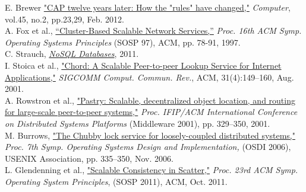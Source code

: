\documentclass[12pt]{article}
\begin{document}
\clearpage
\begin{thebibliography}{9}

	E. Brewer
	\href{http://ieeexplore.ieee.org.proxy.uchicago.edu/ielx5/2/6155638/06133253.pdf}
	{"CAP twelve years later: How the "rules" have changed,"}
	{\em Computer}, vol.45, no.2, pp.23,29,
	Feb. 2012. \\

	A. Fox et al.,
	\href{http://www.cs.berkeley.edu/~brewer/cs262b/TACC.pdf}
	{“Cluster-Based Scalable Network Services,”}
	{\em Proc. 16th ACM Symp. Operating Systems Principles} 
	(SOSP 97),
	ACM,
	pp. 78-91,
	1997. \\

	C. Strauch,
	\href{http://www.christof-strauch.de/nosqldbs.pdf}
	{\em NoSQL Databases},
	2011. \\

	I. Stoica et al.,
	\href{http://pdos.csail.mit.edu/papers/chord:sigcomm01/chord_sigcomm.pdf}
	{"Chord: A Scalable Peer-to-peer Lookup Service for Internet Applications,"} 
	{\em SIGCOMM Comput. Commun. Rev.},
	ACM, 31(4):149–160,
	Aug. 2001. \\

	A. Rowstron et al.,
	\href{http://www.cs.unibo.it/~babaoglu/courses/cas12-13/resources/tutorials/pastry.pdf}
	{"Pastry: Scalable, decentralized object location, and routing for large-scale peer-to-peer systems,"}
	{\em Proc. IFIP/ACM International Conference on Distributed Systems Platforms}
	(Middleware 2001),
	pp. 329–350,
	2001. \\

	M. Burrows,
	\href{http://static.googleusercontent.com/media/research.google.com/en/us/archive/chubby-osdi06.pdf}
	{"The Chubby lock service for loosely-coupled distributed systems,"}
	{\em Proc. 7th Symp. Operating Systems Design and Implementation,}
	(OSDI 2006),
	USENIX Association,
	pp. 335–350, Nov. 2006. \\


	L. Glendenning et al.,
	\href{http://homes.cs.washington.edu/~arvind/papers/scatter.pdf}
	{"Scalable Consistency in Scatter,"}
	{\em Proc. 23rd ACM Symp. Operating System Principles},
	(SOSP 2011), ACM,
	Oct. 2011. \\

\end{thebibliography}
\end{document}
